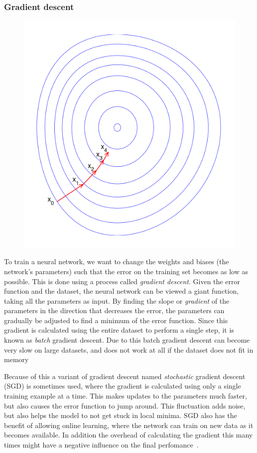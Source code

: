 \documentclass{kththesis}
\begin{document}
\subsubsection{Gradient descent}
\begin{figure}
  \includegraphics[width=1.6\linewidth]{img/gradient_descent.png}
\end{figure}
To train a neural network, we want to change the weights and biases (the network's parameters) such that the error on the training set becomes as low as possible. This is done using a process called \textit{gradient descent}. Given the error function and the dataset, the neural network can be viewed a giant function, taking all the parameters as input. By finding the slope or \textit{gradient} of the parameters in the direction that decreases the error, the parameters can gradually be adjusted to find a minimum of the error function. Since this gradient is calculated using the entire dataset to perform a single step, it is known as \textit{batch} gradient descent. Due to this batch gradient descent can become very slow on large datasets, and does not work at all if the dataset does not fit in memory~\cite{gradient_descent}

Because of this a variant of gradient descent named \textit{stochastic} gradient descent (SGD) is sometimes used, where the gradient is calculated using only a single training example at a time. This makes updates to the parameters much faster, but also causes the error function to jump around. This fluctuation adds noise, but also helps the model to not get stuck in local minima. SGD also has the benefit of allowing online learning, where the network can train on new data as it becomes available. In addition the overhead of calculating the gradient this many times might have a negative influence on the final perfomance~\cite{gradient_descent}.
\end{document}
